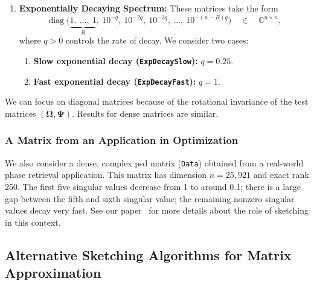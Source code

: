 \documentclass[final]{siamart1116}
\numberwithin{equation}{section}
\numberwithin{theorem}{section}
\numberwithin{figure}{section}
\newcommand{\C}{\mathbb{C}}
\newcommand{\mtx}[1]{\bm{#1}}
\newcommand{\diag}{\operatorname{diag}}
\begin{document}
\begin{enumerate}
\vspace{0.5pc}

\item	\textbf{Exponentially Decaying Spectrum:}  These matrices take the form
$$
\diag\big( \underbrace{1,\ \dots,\ 1}_R,\ 10^{-q},\ 10^{-2q},\ 10^{-3q},\ \dots,\ 10^{- (n-R) q} \big) \quad\in\quad \C^{n \times n},
$$
where $q > 0$ controls the rate of decay.  We consider two cases:

\vspace{0.5pc}

\begin{enumerate}
\item	\textbf{Slow exponential decay (\texttt{ExpDecaySlow}):} $q = 0.25$.
\item	\textbf{Fast exponential decay (\texttt{ExpDecayFast}):} $q = 1$.
\end{enumerate}
\end{enumerate}

\vspace{0.5pc}

We can focus on diagonal matrices because of the rotational invariance of the
test matrices $(\mtx{\Omega}, \mtx{\Psi})$.  Results for dense matrices
are similar.





\subsubsection{A Matrix from an Application in Optimization}
\label{eqn:cgm-matrix}

We also consider a dense, complex psd matrix (\texttt{Data})
obtained from a real-world phase retrieval application.
This matrix has dimension $n = 25,921$ and exact rank 250.
The first five singular values decrease from 1 to around 0.1;
there is a large gap between the fifth and sixth singular value;
the remaining nonzero singular values decay very fast.
See our paper~\cite{YUTC16:Sketchy-Decisions} for more details
about the role of sketching in this context.


















\subsection{Alternative Sketching Algorithms for Matrix Approximation}
\label{sec:other-algs}
\end{document}
